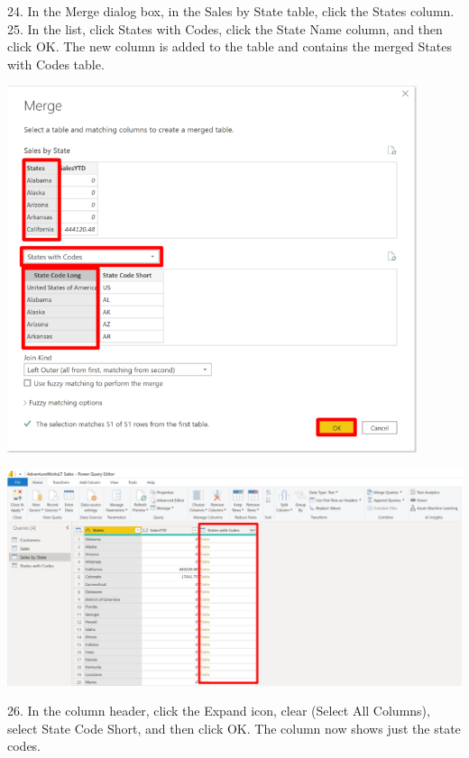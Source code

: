 \documentclass[12pt,letterpaper]{article}
\begin{document}
24. In the Merge dialog box, in the Sales by State table, click the States column.
\\25. In the list, click States with Codes, click the State Name column, and then click OK. The new column is
added to the table and contains the merged States with Codes table.
\begin{center}
    \includegraphics[width=12cm]{img/64.png}  
\end{center}
\begin{center}
    \includegraphics[width=18cm]{img/65.png}
    \vspace{2cm}   
\end{center}
26. In the column header, click the Expand icon, clear (Select All Columns), select State Code Short,
and then click OK. The column now shows just the state codes.
\end{document}
